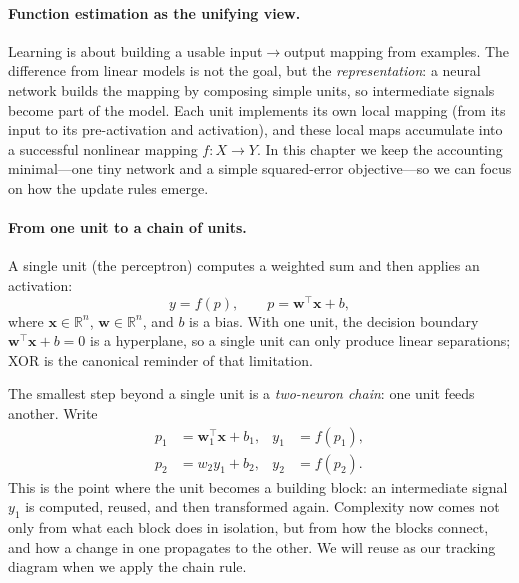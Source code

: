 \paragraph{Function estimation as the unifying view.}
Learning is about building a usable input\(\rightarrow\)output mapping from examples. The difference from linear models is not the goal, but the \emph{representation}: a neural network builds the mapping by composing simple units, so intermediate signals become part of the model. Each unit implements its own local mapping (from its input to its pre-activation and activation), and these local maps accumulate into a successful nonlinear mapping \(f: X \to Y\). In this chapter we keep the accounting minimal---one tiny network and a simple squared-error objective---so we can focus on how the update rules emerge.

\paragraph{From one unit to a chain of units.}
A single unit (the perceptron) computes a weighted sum and then applies an activation:
\begin{equation}
 y = f(p), \qquad p = \mathbf{w}^\top\mathbf{x} + b,
 \label{eq:perceptron_forward}
\end{equation}
where $\mathbf{x}\in\mathbb{R}^n$, $\mathbf{w}\in\mathbb{R}^n$, and $b$ is a bias. With one unit, the decision boundary $\mathbf{w}^\top\mathbf{x}+b=0$ is a hyperplane, so a single unit can only produce linear separations; XOR is the canonical reminder of that limitation.

The smallest step beyond a single unit is a \emph{two\hyp{}neuron chain}: one unit feeds another. Write
\begin{equation}
\begin{aligned}
 p_1 &= \mathbf{w}_1^\top \mathbf{x} + b_1, & y_1 &= f(p_1), \\
 p_2 &= w_2 y_1 + b_2, & y_2 &= f(p_2).
\end{aligned}
\label{eq:two_neuron_forward}
\end{equation}
This is the point where the unit becomes a building block: an intermediate signal $y_1$ is computed, reused, and then transformed again. Complexity now comes not only from what each block does in isolation, but from how the blocks connect, and how a change in one propagates to the other. We will reuse  as our tracking diagram when we apply the chain rule.


